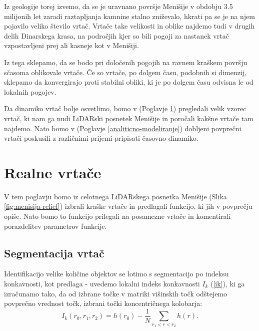 \documentclass[a4paper, twoside, 12pt]{book}
\begin{document}
Iz geologije torej izvemo, da se je uravnano površje Menišije v obdobju 3.5 milijonih let zaradi raztapljanja kamnine stalno zniževalo, hkrati pa se je na njem pojavilo veliko število vrtač. Vrtače take velikosti in oblike najdemo tudi v drugih delih Dinarskega krasa, na področjih kjer so bili pogoji za nastanek vrtač vzpostavljeni prej ali kasneje kot v Menišiji.

Iz tega sklepamo, da se bodo pri določenih pogojih na ravnem kraškem površju sčasoma oblikovale vrtače. Če so vrtače, po dolgem času, podobnih si dimenzij, sklepamo da konvergirajo proti stabilni obliki, ki je po dolgem času odvisna le od lokalnih pogojev.

Da dinamiko vrtač bolje osvetlimo, bomo v (Poglavje \ref{realne-vrtace}) pregledali velik vzorec vrtač, ki nam ga nudi LiDARski posnetek Menišije in poročali kakšne vrtače tam najdemo. Nato bomo v (Poglavje \ref{analiticno-modeliranje}) dobljeni povprečni vrtači poskusili z različnimi prijemi pripisati časovno dinamiko.
 

  \chapter{Realne vrtače}
  \label{realne-vrtace}

V tem poglavju bomo iz celotnega LiDARskega posnetka Menišije (Slika \ref{fig:menisija-relief}) izbrali kraške vrtače in predlagali funkcijo, ki jih v povprečju opiše. Nato bomo to funkcijo prilegali na posamezne vrtače in komentirali porazdelitev parametrov funkcije.

  \section{Segmentacija vrtač}

Identifikacijo velike količine objektov se lotimo s segmentacijo po indeksu konkavnosti, kot predlaga \cite{doctor13} - uvedemo lokalni indeks konkavnosti $I_k$ (\ref{ik}), ki ga izračunamo tako, da od izbrane točke v matriki višinskih točk odštejemo povprečno vrednost točk, izbrani točki koncentričnega kolobarja:
\begin{equation}  I_k(r_0,r_1,r_2) = h(r_0)- \frac{1}{N}\sum\limits_{r_1<r<r_2} h(r). \label{ik} \end{equation}
\end{document}

